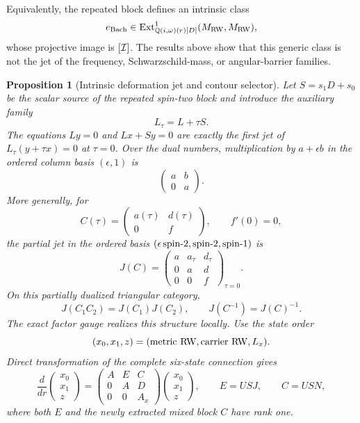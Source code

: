 \documentclass[11pt]{article}
\newtheorem{proposition}[theorem]{Proposition}
\theoremstyle{definition}
\theoremstyle{remark}
\begin{document}
Equivalently, the repeated block defines an intrinsic class
\[
 e_{\rm Bach}\in
 \operatorname{Ext}^1_{\mathbb Q(i,\omega)(r)[D]}
 (M_{\rm RW},M_{\rm RW}),
\]
whose projective image is \([{\cal I}]\).  The results above show that this
generic class is not the jet of the frequency, Schwarzschild-mass, or
angular-barrier families.

\begin{proposition}[Intrinsic deformation jet and contour selector]
\label{prop:axial-qnm-intrinsic-jet}
Let \(S=s_1D+s_0\) be the scalar source of the repeated spin-two block and
introduce the auxiliary family
\[
 L_\tau=L+\tau S.
\]
The equations \(Ly=0\) and \(Lx+Sy=0\) are exactly the first jet of
\(L_\tau(y+\tau x)=0\) at \(\tau=0\).  Over the dual numbers, multiplication
by \(a+\epsilon b\) in the ordered column basis \((\epsilon,1)\) is
\[
 \begin{pmatrix}a&b\\0&a\end{pmatrix}.
\]
More generally, for
\[
 C(\tau)=\begin{pmatrix}a(\tau)&d(\tau)\\0&f\end{pmatrix},
 \qquad f'(0)=0,
\]
the partial jet in the ordered basis
\((\epsilon\,{\rm spin}\text{-}2,{\rm spin}\text{-}2,{\rm spin}\text{-}1)\)
is
\[
 J(C)=
 \begin{pmatrix}
 a&a_\tau&d_\tau\\
 0&a&d\\
 0&0&f
 \end{pmatrix}_{\tau=0}.
\]
On this partially dualized triangular category,
\[
 J(C_1C_2)=J(C_1)J(C_2),\qquad
 J(C^{-1})=J(C)^{-1}.
\]
The exact factor gauge realizes this structure locally.  Use the state order
\[
 (x_0,x_1,z)
 =({\rm metric\ RW},{\rm carrier\ RW},L_x).
\]
Direct transformation of the complete six-state connection gives
\[
 \frac{d}{dr}
 \begin{pmatrix}x_0\\x_1\\z\end{pmatrix}
 =
 \begin{pmatrix}
 A&E&C\\
 0&A&D\\
 0&0&A_x
 \end{pmatrix}
 \begin{pmatrix}x_0\\x_1\\z\end{pmatrix},
 \qquad
 E=USJ,\qquad C=USN,
\]
where both \(E\) and the newly extracted mixed block \(C\) have rank one.

\end{proposition}
\end{document}
